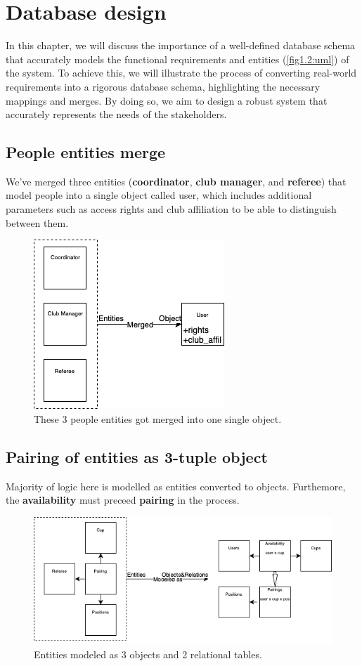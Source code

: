 \section{Database design}
In this chapter, we will discuss the importance of a well-defined database schema that accurately models the functional requirements and entities (\autoref{fig1.2:uml}) of the system. To achieve this, we will illustrate the process of converting real-world requirements into a rigorous database schema, highlighting the necessary mappings and merges. By doing so, we aim to design a robust system that accurately represents the needs of the stakeholders.
\subsection*{People entities merge}
We've merged three entities (\textbf{coordinator}, \textbf{club manager}, and \textbf{referee}) that model people into a single object called user, which includes additional parameters such as access rights and club affiliation to be able to distinguish  between them.
\begin{figure}[h]	
	\centering	
    \includegraphics[scale=0.5]{img/entities_to_user.png}
	\caption{These 3 people entities got merged into one single object.}
	\label{fig2.6:enttousr}
\end{figure}
\subsection*{Pairing of entities as 3-tuple object}
Majority of logic here is modelled as entities converted to objects. Furthemore, the \textbf{availability} must preceed \textbf{pairing} in the process.
\begin{figure}[h]	
	\centering	
    \includegraphics[scale=0.5]{img/entities_pairing_to_obj_rels.png}
	\caption{Entities modeled as 3 objects and 2 relational tables.}
	\label{fig2.7:entrels}
\end{figure}
